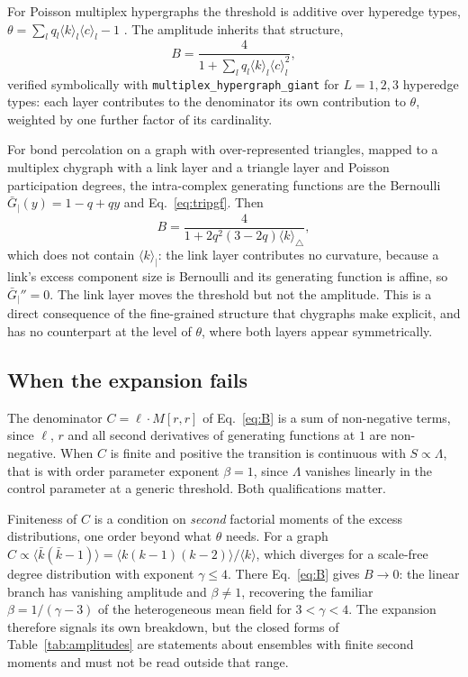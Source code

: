 \documentclass[aps,pre,twocolumn,superscriptaddress,floatfix,longbibliography]{revtex4-2}
\newcommand{\ave}[1]{\langle #1 \rangle}
\newcommand{\kb}{\bar{k}}
\newcommand{\code}[1]{\texttt{#1}}
\begin{document}
For Poisson multiplex hypergraphs the threshold is additive over hyperedge
types, $\theta=\sum_l q_l\ave{k}_l\ave{c}_l-1$
\cite{sun2021,vazquez2024comnet}. The amplitude inherits that structure,
\begin{equation}
  B=\frac{4}{1+\sum_l q_l\ave{k}_l\ave{c}_l^2},
  \label{eq:Bmultiplex}
\end{equation}
verified symbolically with \code{multiplex\_hypergraph\_giant} for $L=1,2,3$
hyperedge types: each layer contributes to
the denominator its own contribution to $\theta$, weighted by one further factor
of its cardinality.

For bond percolation on a graph with over-represented triangles, mapped to a
multiplex chygraph with a link layer and a triangle layer and Poisson
participation degrees, the intra-complex generating functions are the Bernoulli
$\bar G_|(y)=1-q+qy$ and Eq.~\eqref{eq:tripgf}. Then
\begin{equation}
  B=\frac{4}{1+2q^2(3-2q)\ave{k}_\triangle},
  \label{eq:Btriangle}
\end{equation}
which does not contain $\ave{k}_|$: the link layer contributes no curvature,
because a link's excess component size is Bernoulli and its generating function
is affine, so $\bar G_|''=0$. The link layer moves the threshold but not the
amplitude. This is a direct consequence of the fine-grained structure that
chygraphs make explicit, and has no counterpart at the level of $\theta$, where
both layers appear symmetrically.


\subsection{When the expansion fails}

The denominator $C=\ell\cdot M[r,r]$ of Eq.~\eqref{eq:B} is a sum of
non-negative terms, since $\ell$, $r$ and all second derivatives of generating
functions at $1$ are non-negative. When $C$ is finite and positive the
transition is continuous with $S\propto\Lambda$, that is with order parameter
exponent $\beta=1$, since $\Lambda$ vanishes linearly in the control parameter
at a generic threshold. Both qualifications matter.

Finiteness of $C$ is a condition on \emph{second} factorial moments of the
excess distributions, one order beyond what $\theta$ needs. For a graph
$C\propto\ave{\kb(\kb-1)}=\ave{k(k-1)(k-2)}/\ave{k}$, which diverges for a
scale-free degree distribution with exponent $\gamma\le4$. There
Eq.~\eqref{eq:B} gives $B\to0$: the linear branch has vanishing amplitude and
$\beta\ne1$, recovering the familiar $\beta=1/(\gamma-3)$ of the
heterogeneous mean field for $3<\gamma<4$. The expansion therefore signals its
own breakdown, but the closed forms of Table~\ref{tab:amplitudes} are
statements about ensembles with finite second moments and must not be read
outside that range.
\end{document}
